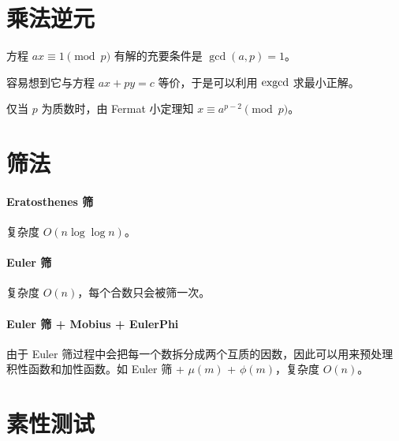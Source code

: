 \documentclass{probook}
\begin{document}
\begin{multicols}{2}


\section{乘法逆元}

方程 $ax \equiv 1 \pmod p$ 有解的充要条件是 $\gcd(a,p) = 1$。

容易想到它与方程 $ax + py = c$ 等价，于是可以利用 $\rm exgcd$ 求最小正解。



仅当 $p$ 为质数时，由 Fermat 小定理知 $x \equiv a^{p-2} \pmod p$。



\section{筛法}

\paragraph{Eratosthenes 筛}

复杂度 $O(n\log \log n)$。



\paragraph{Euler 筛}

复杂度 $O(n)$，每个合数只会被筛一次。



\paragraph{Euler 筛 + Mobius + EulerPhi}

由于 Euler 筛过程中会把每一个数拆分成两个互质的因数，因此可以用来预处理积性函数和加性函数。如 Euler 筛 + $\mu(m)$ + $\phi(m)$，复杂度 $O(n)$。



\section{素性测试}


\end{multicols}
\end{document}
